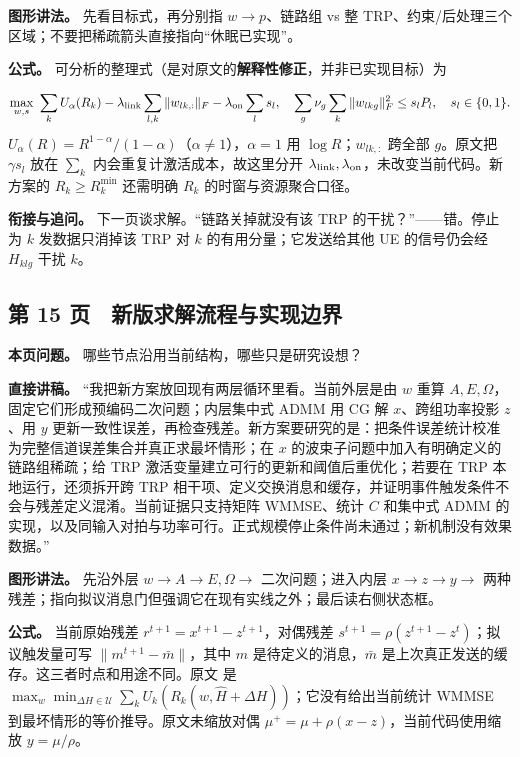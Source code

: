 \documentclass[11pt,a4paper]{ctexart}
\begin{document}
\textbf{图形讲法。} 先看目标式，再分别指 $w\to p$、链路组 vs 整 TRP、约束/后处理三个区域；不要把稀疏箭头直接指向“休眠已实现”。\par

\textbf{公式。} 可分析的整理式（是对原文的\textbf{解释性修正}，并非已实现目标）为\par
\[
\max_{w,s}\ \sum_k U_\alpha(R_k)-\lambda_{\rm link}\sum_{l,k}\|w_{lk,:}\|_F-\lambda_{\rm on}\sum_l s_l,
\quad \sum_g\nu_g\sum_k\|w_{lkg}\|_F^2\le s_lP_l,
\quad s_l\in\{0,1\}.
\]
$U_\alpha(R)=R^{1-\alpha}/(1-\alpha)$（$\alpha\ne1$），$\alpha=1$ 用 $\log R$；$w_{lk,:}$ 跨全部 $g$。原文把 $\gamma s_l$ 放在 $\sum_k$ 内会重复计激活成本，故这里分开 $\lambda_{\rm link},\lambda_{\rm on}$，未改变当前代码。新方案的 $R_k\ge R_k^{\min}$ 还需明确 $R_k$ 的时窗与资源聚合口径。\par

\textbf{衔接与追问。} 下一页谈求解。“链路关掉就没有该 TRP 的干扰？”——错。停止为 $k$ 发数据只消掉该 TRP 对 $k$ 的有用分量；它发送给其他 UE 的信号仍会经 $H_{klg}$ 干扰 $k$。\par

\subsection*{第 15 页　新版求解流程与实现边界}

\textbf{本页问题。} 哪些节点沿用当前结构，哪些只是研究设想？\par

\textbf{直接讲稿。} “我把新方案放回现有两层循环里看。当前外层是由 $w$ 重算 $A,E,\Omega$，固定它们形成预编码二次问题；内层集中式 ADMM 用 CG 解 $x$、跨组功率投影 $z$、用 $y$ 更新一致性误差，再检查残差。新方案要研究的是：把条件误差统计校准为完整信道误差集合并真正求最坏情形；在 $x$ 的波束子问题中加入有明确定义的链路组稀疏；给 TRP 激活变量建立可行的更新和阈值后重优化；若要在 TRP 本地运行，还须拆开跨 TRP 相干项、定义交换消息和缓存，并证明事件触发条件不会与残差定义混淆。当前证据只支持矩阵 WMMSE、统计 $C$ 和集中式 ADMM 的实现，以及同输入对拍与功率可行。正式规模停止条件尚未通过；新机制没有效果数据。”\par

\textbf{图形讲法。} 先沿外层 $w\to A\to E,\Omega\to$ 二次问题；进入内层 $x\to z\to y\to$ 两种残差；指向拟议消息门但强调它在现有实线之外；最后读右侧状态框。\par

\textbf{公式。} 当前原始残差 $r^{t+1}=x^{t+1}-z^{t+1}$，对偶残差 $s^{t+1}=\rho(z^{t+1}-z^t)$；拟议触发量可写 $\|m^{t+1}-\bar m\|$，其中 $m$ 是待定义的消息，$\bar m$ 是上次真正发送的缓存。这三者时点和用途不同。原文  是 $\max_w\min_{\Delta H\in\mathcal U}\sum_k U_k(R_k(w,\widehat H+\Delta H))$；它没有给出当前统计 WMMSE 到最坏情形的等价推导。原文未缩放对偶 $\mu^+=\mu+\rho(x-z)$，当前代码使用缩放 $y=\mu/\rho$。\par
\end{document}

